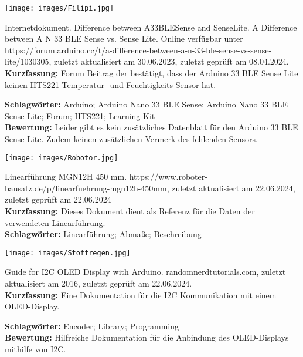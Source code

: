 {
\begin{minipage}{0.38\textwidth}
	\texttt{[image: images/Filipi.jpg]}
\end{minipage}
\hfill
\begin{minipage}{0.6\textwidth}
Internetdokument. Difference between A33BLESense and SenseLite. A Difference between A N 33 BLE Sense vs. Sense Lite. Online verfügbar unter https://forum.arduino.cc/t/a-difference-between-a-n-33-ble-sense-vs-sense-lite/1030305, zuletzt aktualisiert am 30.06.2023, zuletzt geprüft am 08.04.2024.
\\ \textbf{Kurzfassung:}
Forum Beitrag der bestätigt, dass der Arduino 33 BLE Sense Lite keinen HTS221 Temperatur- und Feuchtigkeits-Sensor hat.
\end{minipage}
\textbf{Schlagwörter:}
Arduino; Arduino Nano 33 BLE Sense; Arduino Nano 33 BLE Sense Lite; Forum; HTS221; Learning Kit
\\ \textbf{Bewertung:}
Leider gibt es kein zusätzliches Datenblatt für den Arduino 33 BLE Sense Lite. Zudem keinen zusätzlichen Vermerk des fehlenden Sensors.
}

{
	\begin{minipage}{0.38\textwidth}
		\texttt{[image: images/Robotor.jpg]}
	\end{minipage}
	\hfill
	\begin{minipage}{0.6\textwidth}
		Linearführung MGN12H 450 mm. https://www.roboter-bausatz.de/p/linearfuehrung-mgn12h-450mm, zuletzt aktualisiert am 22.06.2024, zuletzt geprüft am 22.06.2024
		\\ \textbf{Kurzfassung:} Dieses Dokument dient als Referenz für die Daten der verwendeten Linearführung. 
		\\ \textbf{Schlagwörter:} Linearführung; Abmaße; Beschreibung
	\end{minipage}
}


{
	\begin{minipage}{0.38\textwidth}
		\texttt{[image: images/Stoffregen.jpg]}
	\end{minipage}
	\hfill
	\begin{minipage}{0.6\textwidth}
		Guide for I2C OLED Display with Arduino.
		randomnerdtutorials.com, zuletzt aktualisiert am 2016, zuletzt geprüft am 22.06.2024.
		\\ \textbf{Kurzfassung:}
		Eine Dokumentation für die I2C Kommunikation mit einem OLED-Display.
	\end{minipage}
	\textbf{Schlagwörter:}
	Encoder; Library; Programming
	\\ \textbf{Bewertung:}
	Hilfreiche Dokumentation für die Anbindung des OLED-Displays mithilfe von I2C.
}

